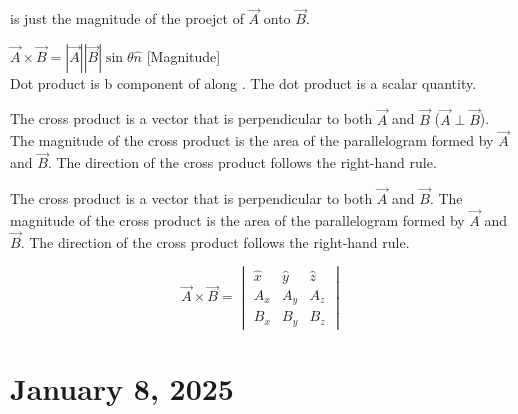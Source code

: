 \documentclass[11pt, draft]{article}
\begin{document}
 is just the magnitude of the proejct of \(\vec{A}\) onto \(\vec{B}\).

$\vec{A} \times \vec{B} = |\vec{A}| |\vec{B}| \sin \theta \hat{n}$ [Magnitude] \\
Dot product is b component of  along . The dot product is a scalar quantity.

The cross product is a vector that is perpendicular to both \(\vec{A}\) and
\(\vec{B}\) (\(\vec{A} \perp \vec{B}\)). The magnitude of the cross product is
the area of the parallelogram formed by \(\vec{A}\) and \(\vec{B}\). The
direction of the cross product follows the right-hand rule.

    {The cross product is a vector that is perpendicular to both \(\vec{A}\) and \(\vec{B}\). The magnitude of the cross product is the area of the parallelogram formed by \(\vec{A}\) and \(\vec{B}\). The direction of the cross product follows the right-hand rule.}

\[
    \vec{A} \times \vec{B} = \begin{vmatrix}
        \hat{x} & \hat{y} & \hat{z} \\
        A_x     & A_y     & A_z     \\
        B_x     & B_y     & B_z
    \end{vmatrix}
\]
\section{January 8, 2025}
\end{document}
